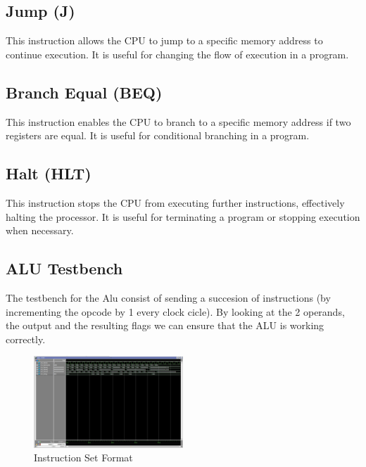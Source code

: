 \documentclass[9pt,a4paper,twoside]{tau}
\begin{document}
    
        \subsection{Jump (J)}
        This instruction allows the CPU to jump to a specific memory address to continue execution. It is useful for changing the flow of execution in a program. 
        \subsection{Branch Equal (BEQ)}
        This instruction enables the CPU to branch to a specific memory address if two registers are equal. It is useful for conditional branching in a program. 
        \subsection{Halt (HLT)}
        This instruction stops the CPU from executing further instructions, effectively halting the processor. It is useful for terminating a program or stopping execution when necessary.


        \subsection{ALU Testbench}
        The testbench for the Alu consist of sending a succesion of instructions (by incrementing the opcode by 1 every clock cicle). By looking at the 2 operands, the output and the resulting flags we can ensure that the ALU is working correctly.
        \begin{figure}[h]  %
            \centering  %
            \includegraphics[width=0.5\textwidth]{images_tb/alu_tb.png}
            \caption{Instruction Set Format}
            \label{fig:ISA Format}
        \end{figure}
    
        
\end{document}
